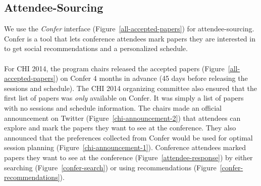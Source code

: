 \documentclass[letterpaper]{article}
\begin{document}
\subsection{Attendee-Sourcing}
We use the \emph{Confer} interface (Figure~\ref{all-accepted-papers}) for attendee-sourcing. Confer is a tool that lets conference attendees mark papers they are interested in to get social recommendations and a personalized schedule.
\\
\\
For CHI 2014, the program chairs released the accepted papers (Figure~\ref{all-accepted-papers}) on Confer 4 months in advance (45 days before releasing the sessions and schedule). The CHI 2014 organizing committee also ensured that the first list of papers was \emph{only} available on Confer. It was simply a list of papers with no sessions and schedule information. The chairs made an official announcement on Twitter (Figure~\ref{chi-announcement-2}) that attendees can explore and mark the papers they want to see at the conference. They also announced that the preferences collected from Confer would be used for optimal session planning (Figure~\ref{chi-announcement-1}). Conference attendees marked papers they want to see at the conference (Figure~\ref{attendee-response}) by either searching (Figure~\ref{confer-search}) or using recommendations (Figure~\ref{confer-recommendations}).
\end{document}
